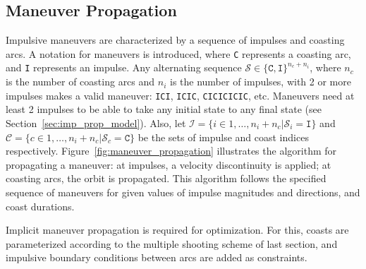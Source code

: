 
\subsection{Maneuver Propagation}\label{sec:maneuver_propagation}

Impulsive maneuvers are characterized by a sequence of impulses and coasting arcs. A notation for maneuvers is introduced, where \texttt{C} represents a coasting arc, and \texttt{I} represents an impulse. Any alternating sequence \(\mathcal{S} \in \{\texttt{C}, \texttt{I}\}^{n_c + n_i}\), where \(n_c\) is the number of coasting arcs and \(n_i\) is the number of impulses, with 2 or more impulses makes a valid maneuver: \texttt{ICI}, \texttt{ICIC}, \texttt{CICICICIC}, etc. Maneuvers need at least 2 impulses to be able to take any initial state to any final state (see Section~\ref{sec:imp_prop_model}). Also, let \(\mathcal{I} = \{i \in 1,\dots,n_i+n_c | \mathcal{S}_i = \texttt{I}\}\) and \(\mathcal{C} = \{c \in 1,\dots,n_i+n_c | \mathcal{S}_c = \texttt{C}\}\) be the sets of impulse and coast indices respectively. Figure~\ref{fig:maneuver_propagation} illustrates the algorithm for propagating a maneuver: at impulses, a velocity discontinuity is applied; at coasting arcs, the orbit is propagated. This algorithm follows the specified sequence of maneuvers for given values of impulse magnitudes and directions, and coast durations. 

Implicit maneuver propagation is required for optimization. For this, coasts are parameterized according to the multiple shooting scheme of last section, and impulsive boundary conditions between arcs are added as constraints.  


